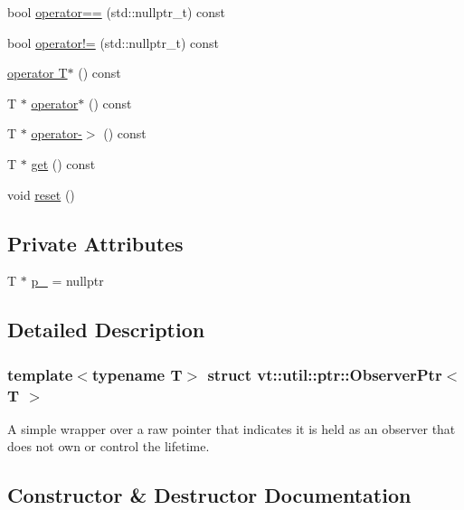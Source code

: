 \begin{DoxyCompactItemize}
\item 
bool \hyperlink{structvt_1_1util_1_1ptr_1_1_observer_ptr_a655edf2fad3912f22fa9e2a97278d655}{operator==} (std\+::nullptr\+\_\+t) const
\item 
bool \hyperlink{structvt_1_1util_1_1ptr_1_1_observer_ptr_a1bb9ff73eed768a8e71c00587db08312}{operator!=} (std\+::nullptr\+\_\+t) const
\item 
\hyperlink{structvt_1_1util_1_1ptr_1_1_observer_ptr_a61aa176c133afa161529a374f0ca0832}{operator T$\ast$} () const
\item 
T $\ast$ \hyperlink{structvt_1_1util_1_1ptr_1_1_observer_ptr_a398c248bc2d31144660dedc526ba5003}{operator$\ast$} () const
\item 
T $\ast$ \hyperlink{structvt_1_1util_1_1ptr_1_1_observer_ptr_aa822ecd1a2f19ffc080eeb6816ea652c}{operator-\/$>$} () const
\item 
T $\ast$ \hyperlink{structvt_1_1util_1_1ptr_1_1_observer_ptr_a727d1e47b06c7603c40a6225866f0754}{get} () const
\item 
void \hyperlink{structvt_1_1util_1_1ptr_1_1_observer_ptr_a2d0cdf1cc2ae2c930e8c0c7b444f4a93}{reset} ()
\end{DoxyCompactItemize}
\subsection*{Private Attributes}
\begin{DoxyCompactItemize}
\item 
T $\ast$ \hyperlink{structvt_1_1util_1_1ptr_1_1_observer_ptr_afa7f8e2e3bca0e7ec27d61e10443b463}{p\+\_\+} = nullptr
\end{DoxyCompactItemize}


\subsection{Detailed Description}
\subsubsection*{template$<$typename T$>$\newline
struct vt\+::util\+::ptr\+::\+Observer\+Ptr$<$ T $>$}

A simple wrapper over a raw pointer that indicates it is held as an observer that does not own or control the lifetime. 

\subsection{Constructor \& Destructor Documentation}
\mbox{\label{structvt_1_1util_1_1ptr_1_1_observer_ptr_a6130f8e36c57c992ab5fc8ce954f921b}} 
